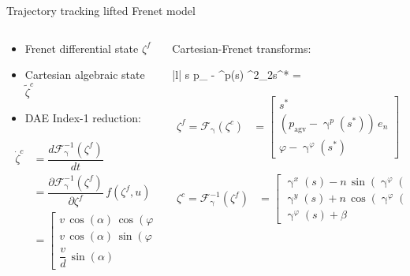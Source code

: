 \documentclass[10pt,aspectratio=1610]{beamer} %
\begin{document}
\begin{frame}{Trajectory tracking lifted Frenet model}
	\begin{columns}[onlytextwidth]
		\begin{column}{0.5\textwidth}
			\begin{itemize}[label=\textbullet]
				\item Frenet differential state ${\zeta}^{f}$
				\item Cartesian algebraic state $\tilde{\zeta}^{c}$
				\item DAE Index-1 reduction: 
			\end{itemize}
		\begin{align*}
					\begin{split}
					\dot{\zeta}^{c} &= \dfrac{d{\mathcal{F}^{-1}_{\upgamma}(\zeta^{f})}}{dt}\\
					&= \dfrac{\partial{\mathcal{F}^{-1}_{\upgamma}(\zeta^{f})}}{\partial{\zeta}^{f}}\,f(\zeta^{f}, u)\\
					&= \begin{bmatrix}
						v\, \cos(\alpha)\, \cos(\varphi)\\
						v\, \cos(\alpha)\, \sin(\varphi)\\
						\dfrac{v}{d}\, \sin(\alpha)
					   \end{bmatrix}
					\end{split}
				\end{align*}
		\end{column}

		\begin{column}{0.5\textwidth}
			Cartesian-Frenet transforms:
			\begin{mini}|l|
				{s}{ \lVert p_{} - \upgamma^{p}(s) \rVert^{2}_{2}}{s^{*} = }{}{{\label{Sopt}}}{}\nonumber
			\end{mini}

			\begin{align*}
				\zeta^{f} = \mathcal{F}_{\upgamma}(\zeta^{c}) &=\begin{bmatrix}
					s^{*}\\
					(p_{\mathrm{agv}} - \upgamma^{p}(s^{*}))\, e_{n}\\
					\varphi - \upgamma^{\varphi}(s^{*})
				\end{bmatrix} 
			\end{align*}
			
			\begin{align*}
				\zeta^{c} = \mathcal{F}^{-1}_{\upgamma}(\zeta^{f}) &=\begin{bmatrix}
					\upgamma^{x}(s) - n\, \sin( \upgamma^{\varphi}(s))\\
					\upgamma^{y}(s) + n\, \cos( \upgamma^{\varphi}(s))\\
					\upgamma^{\varphi}(s) + \beta
				\end{bmatrix} 
			\end{align*}
		\end{column}
	\end{columns}
\end{frame}
\end{document}
